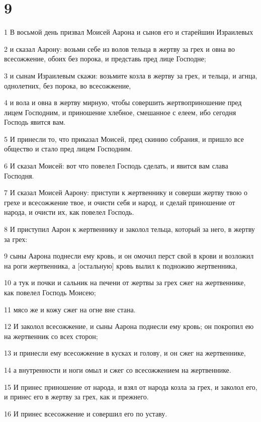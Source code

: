 \chapter{9}

\par 1 В восьмой день призвал Моисей Аарона и сынов его и старейшин Израилевых
\par 2 и сказал Аарону: возьми себе из волов тельца в жертву за грех и овна во всесожжение, обоих без порока, и представь пред лице Господне;
\par 3 и сынам Израилевым скажи: возьмите козла в жертву за грех, и тельца, и агнца, однолетних, без порока, во всесожжение,
\par 4 и вола и овна в жертву мирную, чтобы совершить жертвоприношение пред лицем Господним, и приношение хлебное, смешанное с елеем, ибо сегодня Господь явится вам.
\par 5 И принесли то, что приказал Моисей, пред скинию собрания, и пришло все общество и стало пред лицем Господним.
\par 6 И сказал Моисей: вот что повелел Господь сделать, и явится вам слава Господня.
\par 7 И сказал Моисей Аарону: приступи к жертвеннику и соверши жертву твою о грехе и всесожжение твое, и очисти себя и народ, и сделай приношение от народа, и очисти их, как повелел Господь.
\par 8 И приступил Аарон к жертвеннику и заколол тельца, который за него, в жертву за грех:
\par 9 сыны Аарона поднесли ему кровь, и он омочил перст свой в крови и возложил на роги жертвенника, а [остальную] кровь вылил к подножию жертвенника,
\par 10 а тук и почки и сальник на печени от жертвы за грех сжег на жертвеннике, как повелел Господь Моисею;
\par 11 мясо же и кожу сжег на огне вне стана.
\par 12 И заколол всесожжение, и сыны Аарона поднесли ему кровь; он покропил ею на жертвенник со всех сторон;
\par 13 и принесли ему всесожжение в кусках и голову, и он сжег на жертвеннике,
\par 14 а внутренности и ноги омыл и сжег со всесожжением на жертвеннике.
\par 15 И принес приношение от народа, и взял от народа козла за грех, и заколол его, и принес его в жертву за грех, как и прежнего.
\par 16 И принес всесожжение и совершил его по уставу.
